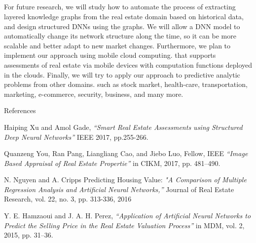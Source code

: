 \documentclass[11pt,fleqn]{book} %
\begin{document}
\subparagraph*{}
For future research, we will study how to automate the process of extracting layered knowledge graphs from the real estate domain based on historical data, and design structured DNNs using the graphs. We will allow a DNN model to automatically change its network structure along the time, so it can be more scalable and better adapt to new market changes. Furthermore, we plan to implement our approach using mobile cloud computing. that supports assessments of real estate via mobile devices with computation functions deployed in the clouds. Finally, we will try to apply our approach to predictive analytic problems from other domains. such as stock market, health-care, transportation, marketing, e-commerce, security, business, and many more. 

\newpage
\bfseries \fontsize{15}{19}\normalfont\centerline{\LARGE\color{ocre} References}
\begin{remark}
    Haiping Xu and Amol Gade, \emph{“Smart Real Estate Assessments using Structured Deep Neural Networks”} IEEE 2017, pp.255-266.
\end{remark}

\begin{remark}
    Quanzeng You, Ran Pang, Liangliang Cao, and Jiebo Luo, Fellow, IEEE
 \emph{“Image Based Appraisal of Real Estate Propertie”} in CIKM, 2017, pp. 481–490.
\end{remark}

\begin{remark}
    N. Nguyen and A. Cripps Predicting Housing Value: \emph{"A Comparison of Multiple Regression Analysis and Artificial Neural Networks,”}  Journal of Real Estate Research, vol. 22, no. 3, pp. 313-336, 2016
\end{remark}

\begin{remark}
    Y. E. Hamzaoui and J. A. H. Perez, \emph{“Application of Artificial Neural Networks to Predict the Selling Price in the Real Estate Valuation Process”} in MDM, vol. 2, 2015, pp. 31–36.
\end{remark}


\newpage
\begingroup
\thispagestyle{empty}
\centering
\vspace*{2cm}
\par\normalfont\fontsize{40}{35}\sffamily\selectfont
\end{document}
